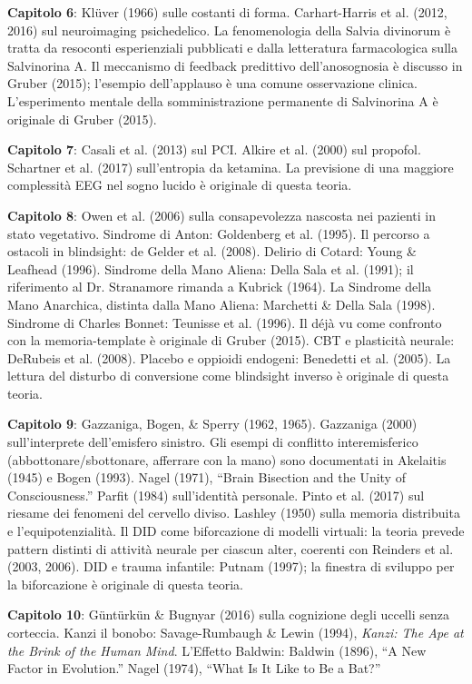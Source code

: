 \documentclass[11pt, twoside, openright]{book}
\begin{document}
\textbf{Capitolo 6}: Klüver (1966) sulle costanti di forma. Carhart-Harris et al. (2012, 2016) sul neuroimaging psichedelico. La fenomenologia della Salvia divinorum è tratta da resoconti esperienziali pubblicati e dalla letteratura farmacologica sulla Salvinorina A. Il meccanismo di feedback predittivo dell'anosognosia è discusso in Gruber (2015); l'esempio dell'applauso è una comune osservazione clinica. L'esperimento mentale della somministrazione permanente di Salvinorina A è originale di Gruber (2015).

\textbf{Capitolo 7}: Casali et al. (2013) sul PCI. Alkire et al. (2000) sul propofol. Schartner et al. (2017) sull'entropia da ketamina. La previsione di una maggiore complessità EEG nel sogno lucido è originale di questa teoria.

\textbf{Capitolo 8}: Owen et al. (2006) sulla consapevolezza nascosta nei pazienti in stato vegetativo. Sindrome di Anton: Goldenberg et al. (1995). Il percorso a ostacoli in blindsight: de Gelder et al. (2008). Delirio di Cotard: Young \& Leafhead (1996). Sindrome della Mano Aliena: Della Sala et al. (1991); il riferimento al Dr. Stranamore rimanda a Kubrick (1964). La Sindrome della Mano Anarchica, distinta dalla Mano Aliena: Marchetti \& Della Sala (1998). Sindrome di Charles Bonnet: Teunisse et al. (1996). Il déjà vu come confronto con la memoria-template è originale di Gruber (2015). CBT e plasticità neurale: DeRubeis et al. (2008). Placebo e oppioidi endogeni: Benedetti et al. (2005). La lettura del disturbo di conversione come blindsight inverso è originale di questa teoria.

\textbf{Capitolo 9}: Gazzaniga, Bogen, \& Sperry (1962, 1965). Gazzaniga (2000) sull'interprete dell'emisfero sinistro. Gli esempi di conflitto interemisferico (abbottonare/\allowbreak{}sbottonare, afferrare con la mano) sono documentati in Akelaitis (1945) e Bogen (1993). Nagel (1971), ``Brain Bisection and the Unity of Consciousness.'' Parfit (1984) sull'identità personale. Pinto et al. (2017) sul riesame dei fenomeni del cervello diviso. Lashley (1950) sulla memoria distribuita e l'equipotenzialità. Il DID come biforcazione di modelli virtuali: la teoria prevede pattern distinti di attività neurale per ciascun alter, coerenti con Reinders et al. (2003, 2006). DID e trauma infantile: Putnam (1997); la finestra di sviluppo per la biforcazione è originale di questa teoria.

\textbf{Capitolo 10}: Güntürkün \& Bugnyar (2016) sulla cognizione degli uccelli senza corteccia. Kanzi il bonobo: Savage-Rumbaugh \& Lewin (1994), \textit{Kanzi: The Ape at the Brink of the Human Mind}. L'Effetto Baldwin: Baldwin (1896), ``A New Factor in Evolution.'' Nagel (1974), ``What Is It Like to Be a Bat?''
\end{document}
